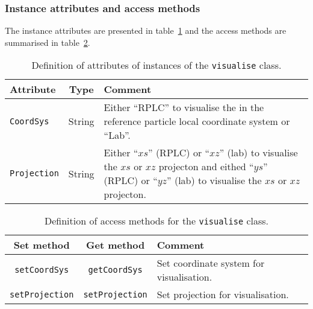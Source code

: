 \subsubsection{Instance attributes and access methods}
\label{Para:vis:InstAttr}
\noindent
The instance attributes are presented in table~\ref{Tab:vis:Attributes}
and the access methods are summarised in table~\ref{Tab:vis:AccessMethods}.
\begin{table}[h]
  \caption{
    Definition of attributes of instances of the \texttt{visualise} class.
  }
  \label{Tab:vis:Attributes}
  \begin{center}
    \begin{tabular}{|l|c|p{12cm}|}
      \hline
      \textbf{Attribute} & \textbf{Type} & \textbf{Comment}                \\
      \hline
      \texttt{CoordSys}  & String & Either ``RPLC'' to visualise the
                                    in the reference particle local
                                    coordinate system or ``Lab''.         \\
      \texttt{Projection}& String & Either ``$xs$'' (RPLC) or ``$xz$''
                                    (lab) to visualise the $xs$ or
                                    $xz$ projecton and eithed ``$ys$'' 
                                    (RPLC) or ``$yz$'' (lab) to
                                    visualise the $xs$ or $xz$
                                    projecton.                            \\
       \hline
    \end{tabular}
  \end{center}
\end{table}
\begin{table}[h]
  \caption{
    Definition of access methods for the \texttt{visualise}
    class. 
  }
  \label{Tab:vis:AccessMethods}
  \begin{center}
    \begin{tabular}{|c|c|p{11cm}|}
      \hline
      \textbf{Set method} & \textbf{Get method}  & \textbf{Comment}                                  \\
      \hline
      \texttt{setCoordSys}     & \texttt{getCoordSys}   & Set coordinate system for visualisation.     \\
      \texttt{setProjection}   & \texttt{setProjection} & Set projection for visualisation.            \\
      \hline
    \end{tabular}
  \end{center}
\end{table}

